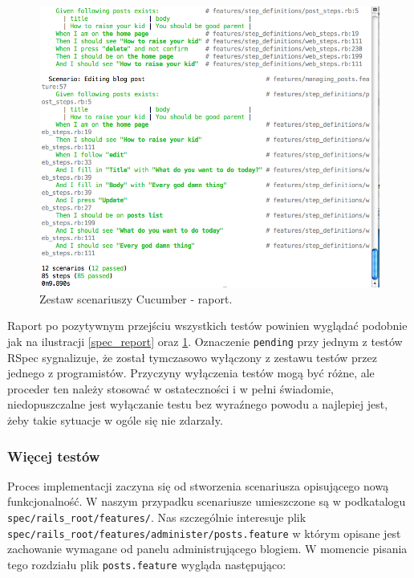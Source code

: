   	\begin{figure}[!h]
  		\begin{center}
  			\includegraphics[width=\linewidth]{images/features_report.png}
  			\caption{Zestaw scenariuszy Cucumber - raport.}
  			\label{features_report}
  		\end{center}
  	\end{figure}
  	
  	  Raport po pozytywnym przejściu wszystkich testów powinien wyglądać podobnie jak na ilustracji \ref{spec_report} oraz \ref{features_report}. Oznaczenie \verb+pending+ przy jednym z testów RSpec sygnalizuje, że został tymczasowo wyłączony z zestawu testów przez jednego z programistów. Przyczyny wyłączenia testów mogą być różne, ale proceder ten należy stosować w ostateczności i w pełni świadomie, niedopuszczalne jest wyłączanie testu bez wyraźnego powodu a najlepiej jest, żeby takie sytuacje w ogóle się nie zdarzały.
  	  
  	\subsubsection{Więcej testów}
  	  Proces implementacji zaczyna się od stworzenia scenariusza opisującego nową funkcjonalność. W naszym przypadku scenariusze umieszczone są w podkatalogu \verb+spec/rails_root/features/+. Nas szczególnie interesuje plik \verb+spec/rails_root/features/administer/posts.feature+ w którym opisane jest zachowanie wymagane od panelu administrującego blogiem. W momencie pisania tego rozdziału plik \verb+posts.feature+ wygląda następująco:
  	  
